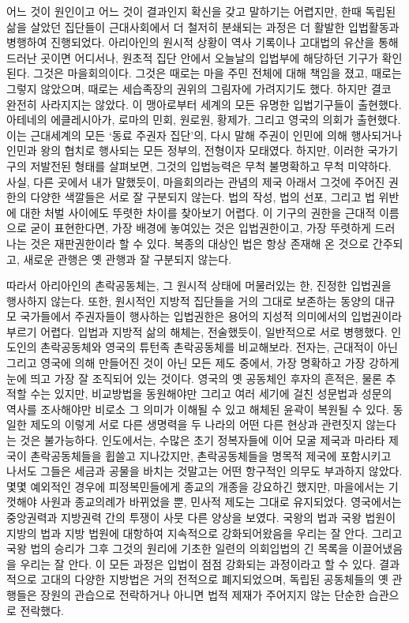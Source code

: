 어느 것이 원인이고 어느 것이 결과인지 확신을 갖고 말하기는 어렵지만,
한때 독립된 삶을 살았던 집단들이 근대사회에서 더 철저히 분쇄되는 과정은
더 활발한 입법활동과 병행하여 진행되었다.
아리아인의 원시적 상황이 역사 기록이나 고대법의 유산을 통해
드러난 곳이면 어디서나,
원초적 집단 안에서 오늘날의 입법부에 해당하던 기구가 확인된다.
그것은 마을회의이다.
그것은 때로는 마을 주민 전체에 대해 책임을 졌고,
때로는 그렇지 않았으며,
때로는 세습족장의 권위의 그림자에 가려지기도 했다.
하지만 결코 완전히 사라지지는 않았다.
이 맹아로부터 세계의 모든 유명한 입법기구들이 출현했다.
아테네의 에클레시아가, 로마의 민회, 원로원, 황제가,
그리고 영국의 의회가 출현했다.
이는 근대세계의 모든 
`동료 주권자 집단'의,
다시 말해 주권이 인민에 의해 행사되거나 인민과 왕의 협치로 행사되는
모든 정부의, 전형이자 모태였다.
하지만,
이러한 국가기구의 저발전된 형태를 살펴보면,
그것의 입법능력은 무척 불명확하고 무척 미약하다.
사실, 다른 곳에서 내가 말했듯이,
마을회의라는 관념의 제국 아래서
그것에 주어진 권한의 다양한 색깔들은 서로 잘 구분되지 않는다.
법의 작성, 법의 선포, 그리고 법 위반에 대한 처벌 사이에도
뚜렷한 차이를 찾아보기 어렵다.
이 기구의 권한을 근대적 이름으로 굳이 표현한다면,
가장 배경에 놓여있는 것은 입법권한이고,
가장 뚜렷하게 드러나는 것은 재판권한이라 할 수 있다.
복종의 대상인 법은 항상 존재해 온 것으로 간주되고,
새로운 관행은 옛 관행과 잘 구분되지 않는다.

따라서 아리아인의 촌락공동체는, 그 원시적 상태에 머물러있는 한,
진정한 입법권을 행사하지 않는다.
또한,
원시적인 지방적 집단들을 거의 그대로 보존하는
동양의 대규모 국가들에서 주권자들이 행사하는 입법권한은
용어의 지성적 의미에서의 입법권이라 부르기 어렵다.
입법과 지방적 삶의 해체는, 전술했듯이, 일반적으로 서로 병행했다.
인도인의 촌락공동체와 영국의 튜턴족 촌락공동체를 비교해보라.
전자는, 근대적이 아닌 그리고 영국에 의해 만들어진 것이 아닌
모든 제도 중에서,
가장 명확하고 가장 강하게 눈에 띄고 가장 잘 조직되어 있는 것이다.
영국의 옛 공동체인 후자의 흔적은, 물론 추적할 수는 있지만,
비교방법을 동원해야만 그리고
여러 세기에 걸친 성문법과 성문의 역사를 조사해야만
비로소 그 의미가 이해될 수 있고
해체된 윤곽이 복원될 수 있다.
동일한 제도의 이렇게 서로 다른 생명력을 두 나라의 어떤 다른 현상과
관련짓지 않는다는 것은 불가능하다.
인도에서는,
수많은 초기 정복자들에 이어
모굴 제국과 마라타 제국이
촌락공동체들을 휩쓸고 지나갔지만,
촌락공동체들을 명목적 제국에 포함시키고 나서도
그들은 세금과 공물을 바치는 것말고는 어떤 항구적인 의무도 부과하지 않았다.
몇몇 예외적인 경우에
피정복민들에게 종교의 개종을 강요하긴 했지만,
마을에서는 기껏해야 사원과 종교의례가 바뀌었을 뿐,
민사적 제도는 그대로 유지되었다.
영국에서는 중앙권력과 지방권력 간의 투쟁이 사뭇 다른 양상을 보였다.
국왕의 법과 국왕 법원이 지방의 법과 지방 법원에 대항하여
지속적으로 강화되어왔음을 우리는 잘 안다.
그리고 국왕 법의 승리가 그후 그것의 원리에 기초한
일련의 의회입법의 긴 목록을 이끌어냈음을 우리는 잘 안다.
이 모든 과정은 입법이 점점 강화되는 과정이라고 할 수 있다.
결과적으로 고대의 다양한 지방법은 거의 전적으로 폐지되었으며,
독립된 공동체들의 옛 관행들은 장원의 관습으로 전락하거나
아니면 법적 제재가 주어지지 않는 단순한 습관으로 전락했다.

